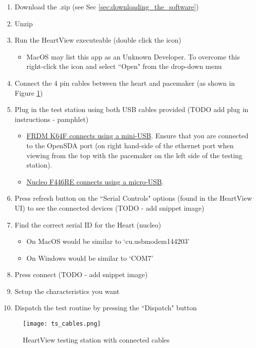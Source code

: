\documentclass[11pt,fleqn]{book} %
\begin{document}
\begin{enumerate}
	\item Download the .zip (see Sec \ref{sec:downloading_the_software})
	\item Unzip
	\item Run the HeartView executeable (double click the icon)
		\begin{itemize}
			\item MacOS may list this app as an Unknown Developer. To overcome this right-click the icon and select ``Open" from the drop-down menu
		\end{itemize}
	\item Connect the 4 pin cables between the heart and pacemaker (as shown in Figure \ref{fig:ts_cables})
	\item Plug in the test station using both USB cables provided (TODO add plug in instructions - pamphlet)
		\begin{itemize}
			\item \underline{FRDM K64F connects using a mini-USB}. Ensure that you are connected to the OpenSDA port (on right hand-side of the ethernet port when viewing from the top with the pacemaker on the left side of the testing station).
			\item \underline{Nucleo F446RE connects using a micro-USB}.
		\end{itemize}
	\item Press refresh button on the ``Serial Controls" options (found in the HeartView UI) to see the connected devices (TODO - add snippet image)
	\item Find the correct serial ID for the Heart (nucleo)
		\begin{itemize}
			\item On MacOS would be similar to `cu.usbmodem144203'
			\item On Windows would be similar to `COM7'
		\end{itemize}
	\item Press connect (TODO - add snippet image)
	\item Setup the characteristics you want
	\item Dispatch the test routine by pressing the ``Dispatch" button
\end{enumerate}

\begin{figure}[h]
	\centering\texttt{[image: ts\_cables.png]}
	\caption{HeartView testing station with connected cables}
	\label{fig:ts_cables} %
\end{figure}
\end{document}
